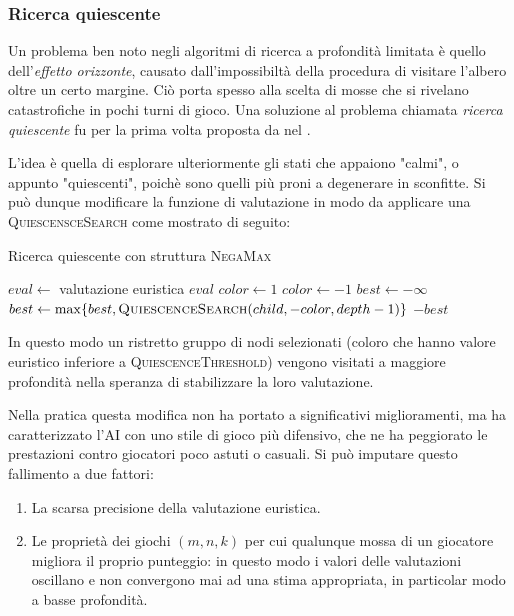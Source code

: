 \documentclass{article}
\begin{document}
\subsubsection*{Ricerca quiescente}

Un problema ben noto negli algoritmi di ricerca a profondit\`a limitata \`e
quello dell'\emph{effetto orizzonte}, causato dall'impossibilt\`a della procedura
di visitare l'albero oltre un certo margine. Ci\`o porta spesso alla scelta di
mosse che si rivelano catastrofiche in pochi turni di gioco. Una soluzione al
problema chiamata \emph{ricerca quiescente} \cite{quiescence} fu per la prima
volta proposta  da \citeauthor{quiescence} nel \citeyear{quiescence}.

L'idea \`e quella di esplorare ulteriormente gli stati che appaiono "calmi", o
appunto "quiescenti", poich\`e sono quelli pi\`u proni a degenerare in sconfitte.
Si pu\`o dunque modificare la funzione di valutazione in modo da applicare una
\textsc{QuiescensceSearch} come mostrato di seguito:

\begin{algorithm}[H]
  \caption{Ricerca quiescente con struttura \textsc{NegaMax}}
  \label{qs}
  \begin{algorithmic}[0]
      \State $eval \gets $ valutazione euristica
        \State \Return $eval$
      \Else
        \State $color \gets 1$
          \State $color \gets -1$
        \EndIf
        \State \Return {}
      \EndIf
    \EndProcedure
    \Statex
      \State \Return {}
    \EndIf
    \State $best \gets -\infty$
      \State $best \gets \max\{best, \Call{QuiescenceSearch}{child, -color, depth-1}\}$
    \EndFor
    \State \Return $-best$
    \EndProcedure
  \end{algorithmic}
\end{algorithm}

In questo modo un ristretto gruppo di nodi selezionati (coloro che hanno valore
euristico inferiore a \textsc{QuiescenceThreshold}) vengono visitati a maggiore
profondit\`a nella speranza di stabilizzare la loro valutazione.

Nella pratica questa modifica non ha portato a significativi miglioramenti,
ma ha caratterizzato l'AI con uno stile di gioco pi\`u difensivo, che ne ha
peggiorato le prestazioni contro giocatori poco astuti o casuali.
Si pu\`o imputare questo fallimento a due fattori:
\begin{enumerate}
  \item La scarsa precisione della valutazione euristica.
  \item Le propriet\`a dei giochi $(m,n,k)$ per cui qualunque mossa di un
    giocatore migliora il proprio punteggio: in questo modo i valori delle
    valutazioni oscillano e non convergono mai ad una stima appropriata, in
    particolar modo a basse profondit\`a.
\end{enumerate}


\pagebreak


\end{document}
